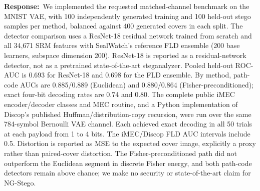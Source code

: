 \documentclass[12pt,a4paper]{article}
\newcommand{\ourresponse}{\noindent\textbf{Response:}\ }
\begin{document}
\ourresponse We implemented the requested matched-channel benchmark on the MNIST VAE, with 100 independently generated training and 100 held-out stego samples per method, balanced against 400 generated covers in each split. The detector comparison uses a ResNet-18 residual network trained from scratch and all 34,671 SRM features with SealWatch's reference FLD ensemble (200 base learners, subspace dimension 200). ResNet-18 is reported as a residual-network detector, not as a pretrained state-of-the-art steganalyzer. Pooled held-out ROC-AUC is 0.693 for ResNet-18 and 0.698 for the FLD ensemble. By method, path-code AUCs are 0.885/0.889 (Euclidean) and 0.880/0.864 (Fisher-preconditioned); exact four-bit decoding rates are 0.74 and 0.80. The complete public iMEC encoder/decoder classes and MEC routine, and a Python implementation of Discop's published Huffman/distribution-copy recursion, were run over the same 784-symbol Bernoulli VAE channel. Each achieved exact decoding in all 50 trials at each payload from 1 to 4 bits. The iMEC/Discop FLD AUC intervals include 0.5. Distortion is reported as MSE to the expected cover image, explicitly a proxy rather than paired-cover distortion. The Fisher-preconditioned path did not outperform the Euclidean segment in discrete Fisher energy, and both path-code detectors remain above chance; we make no security or state-of-the-art claim for NG-Stego.
\end{document}
